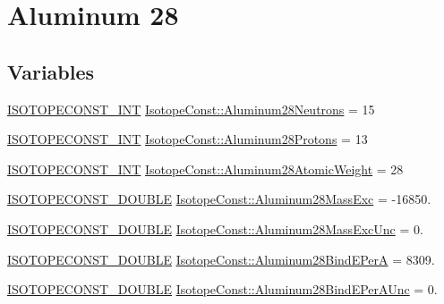 \hypertarget{group___isotope_const-_aluminum-_al28}{}\section{Aluminum 28}
\label{group___isotope_const-_aluminum-_al28}
\subsection*{Variables}
\begin{DoxyCompactItemize}
\item 
\mbox{\hyperlink{group___isotope_const-_macros_ga5f18360b3e99483a35c32d789e62621c}{I\+S\+O\+T\+O\+P\+E\+C\+O\+N\+S\+T\+\_\+\+I\+NT}} \mbox{\hyperlink{group___isotope_const-_aluminum-_al28_ga5ec94b738ce161d4f73be678e4ff5086}{Isotope\+Const\+::\+Aluminum28\+Neutrons}} = 15
\item 
\mbox{\hyperlink{group___isotope_const-_macros_ga5f18360b3e99483a35c32d789e62621c}{I\+S\+O\+T\+O\+P\+E\+C\+O\+N\+S\+T\+\_\+\+I\+NT}} \mbox{\hyperlink{group___isotope_const-_aluminum-_al28_ga48d040d5ff2c64b52a63915645c54b14}{Isotope\+Const\+::\+Aluminum28\+Protons}} = 13
\item 
\mbox{\hyperlink{group___isotope_const-_macros_ga5f18360b3e99483a35c32d789e62621c}{I\+S\+O\+T\+O\+P\+E\+C\+O\+N\+S\+T\+\_\+\+I\+NT}} \mbox{\hyperlink{group___isotope_const-_aluminum-_al28_ga6fbf21a58d4e824bbaca6626f1a31e93}{Isotope\+Const\+::\+Aluminum28\+Atomic\+Weight}} = 28
\item 
\mbox{\hyperlink{group___isotope_const-_macros_ga8f45a7272ce02c0b4c65c44636ed719a}{I\+S\+O\+T\+O\+P\+E\+C\+O\+N\+S\+T\+\_\+\+D\+O\+U\+B\+LE}} \mbox{\hyperlink{group___isotope_const-_aluminum-_al28_ga9b9d01a84fc594ad624548a40929254d}{Isotope\+Const\+::\+Aluminum28\+Mass\+Exc}} = -\/16850.
\item 
\mbox{\hyperlink{group___isotope_const-_macros_ga8f45a7272ce02c0b4c65c44636ed719a}{I\+S\+O\+T\+O\+P\+E\+C\+O\+N\+S\+T\+\_\+\+D\+O\+U\+B\+LE}} \mbox{\hyperlink{group___isotope_const-_aluminum-_al28_gae9f6a5296350b7678cc0b55d605312c0}{Isotope\+Const\+::\+Aluminum28\+Mass\+Exc\+Unc}} = 0.
\item 
\mbox{\hyperlink{group___isotope_const-_macros_ga8f45a7272ce02c0b4c65c44636ed719a}{I\+S\+O\+T\+O\+P\+E\+C\+O\+N\+S\+T\+\_\+\+D\+O\+U\+B\+LE}} \mbox{\hyperlink{group___isotope_const-_aluminum-_al28_ga7e5d3b5a5f25b8e726a5af84da766946}{Isotope\+Const\+::\+Aluminum28\+Bind\+E\+PerA}} = 8309.
\item 
\mbox{\hyperlink{group___isotope_const-_macros_ga8f45a7272ce02c0b4c65c44636ed719a}{I\+S\+O\+T\+O\+P\+E\+C\+O\+N\+S\+T\+\_\+\+D\+O\+U\+B\+LE}} \mbox{\hyperlink{group___isotope_const-_aluminum-_al28_ga47bc064c8d1d87d3c14fe8872bb7c747}{Isotope\+Const\+::\+Aluminum28\+Bind\+E\+Per\+A\+Unc}} = 0.

\end{DoxyCompactItemize}
